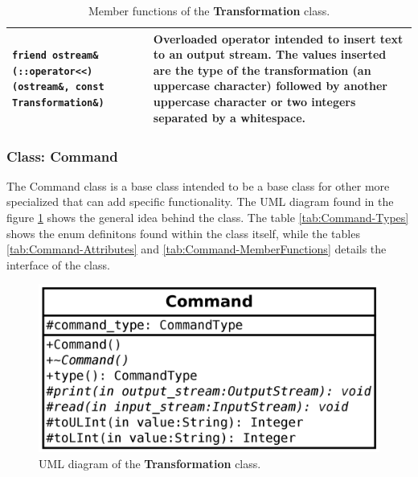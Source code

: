 \documentclass[11pt,twoside,openany,x11names,svgnames]{memoir}
\begin{document}
\begin{table}[h]
\begin{tabular}{| >{\bfseries}p{10cm} | p{5.5cm} |}
	\hline
	
	\texttt{friend ostream\& (::operator<<) (ostream\&, const Transformation\&)} & Overloaded operator intended to insert text to an output stream. The values inserted are the type of the transformation (an uppercase character) followed by another uppercase character or two integers separated by a whitespace. \\
	
	\hline
\end{tabular}
\caption{Member functions of the \textbf{Transformation} class.}
\label{tab:Transformation-MemberFunctions}
\end{table}

\clearpage

\subsubsection{Class: Command}\label{Class-Command}

The Command class is a base class intended to be a base class for other more specialized that can add specific functionality. The UML diagram found in the figure \ref{fig:class-command} shows the general idea behind the class. The table \ref{tab:Command-Types} shows the enum definitons found within the class itself, while the tables \ref{tab:Command-Attributes} and \ref{tab:Command-MemberFunctions} details the interface of the class.

\begin{figure}
	\centering
	\includegraphics[scale=0.2, clip=true, trim= 0pt 0pt 0pt 0pt]{images/chapter03-image16}
	\caption{UML diagram of the \textbf{Transformation} class.}
	\label{fig:class-command}
\end{figure}
\end{document}
